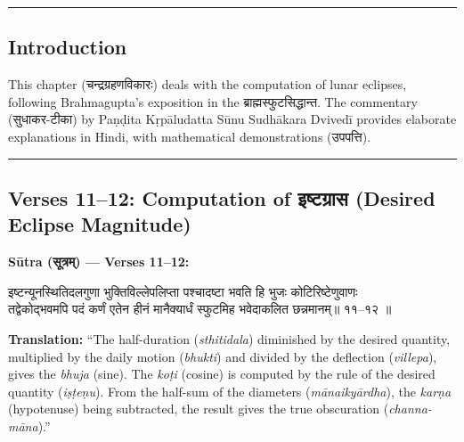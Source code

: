 \documentclass[11pt,a4paper]{article}
\newcommand{\dev}[1]{{\devanagarifont #1}}
\newenvironment{sanskritverse}{%
  \begin{center}\begin{minipage}{0.95\textwidth}
  \setlength{\leftskip}{1em}
  \setlength{\rightskip}{1em}
  \dev
}{\end{minipage}\end{center}}
\newenvironment{paracol}[1]{\begingroup}{\endgroup}
\newcommand{\switchcolumn}[1][]{%
  \ifnum#1=0\relax\else\par\nobreak\vspace{0.5em}\par\nobreak\fi%
}
\begin{document}
\begin{center}
\textcolor{rulecolor}{\rule{0.8\textwidth}{0.5pt}}
\end{center}

\subsection*{Introduction}

This chapter (\dev{चन्द्रग्रहणविकारः}) deals with the computation of lunar eclipses, following Brahmagupta's exposition in the \dev{ब्राह्मस्फुटसिद्धान्त}. The commentary (\dev{सुधाकर-टीका}) by Paṇḍita Kṛpāludatta Sūnu Sudhākara Dvivedī provides elaborate explanations in Hindi, with mathematical demonstrations (\dev{उपपत्ति}).

\begin{center}
\textcolor{rulecolor}{\rule{0.8\textwidth}{0.5pt}}
\end{center}

\subsection{Verses 11--12: Computation of \texorpdfstring{{\devanagarifont इष्टग्रास}}{iṣṭagrāsa} (Desired Eclipse Magnitude)}

\vspace{0.5em}
\noindent\textbf{Sūtra (\dev{सूत्रम्}) — Verses 11--12:}

\begin{paracol}{2}

\begin{sanskritverse}
इष्टन्यूनस्थितिदलगुणा भुक्तिविल्लेपलिप्ता पश्चादष्टा भवति हि भुजः कोटिरिष्टेणुवाणः \\
तद्वेकोद्भवमपि पदं कर्णं एतेन हीनं मानैक्यार्धं स्फुटमिह भवेदाकलित छन्नमानम्॥ ११--१२ ॥
\end{sanskritverse}

\switchcolumn

\textbf{Translation:} ``The half-duration (\textit{sthitidala}) diminished by the desired quantity, multiplied by the daily motion (\textit{bhukti}) and divided by the deflection (\textit{villepa}), gives the \textit{bhuja} (sine). The \textit{koṭi} (cosine) is computed by the rule of the desired quantity (\textit{iṣṭeṇu}). From the half-sum of the diameters (\textit{mānaikyārdha}), the \textit{karṇa} (hypotenuse) being subtracted, the result gives the true obscuration (\textit{channa-māna}).''

\end{paracol}
\end{document}
